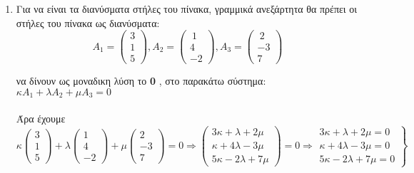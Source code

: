 \documentclass[12pt,a4paper]{article}
\begin{document}
\begin{enumerate}
\item Για να είναι τα διανύσματα στήλες του πίνακα, γραμμικά ανεξάρτητα θα πρέπει οι στήλες του πίνακα ως διανύσματα: \\

\[{A_1} = \left( {\begin{array}{*{20}{c}}
3\\
1\\
5
\end{array}} \right),{A_2} = \left( {\begin{array}{*{20}{c}} \ 
1\\
4\\
{ - 2}
\end{array}} \right),{A_3} = \left( {\begin{array}{*{20}{c}} \ 
2\\
{ - 3}\\
7
\end{array}} \right)\]

να δίνουν ως μοναδικη λύση το \textbf{ 0} , στο παρακάτω σύστημα:
$\kappa {A_1} + \lambda {A_2} + \mu {A_3} = 0$\\\\

Άρα έχουμε 
\[\kappa \left( {\begin{array}{*{20}{c}}
3\\
1\\
5
\end{array}} \right) + \lambda \left( {\begin{array}{*{20}{c}}
1\\
4\\
{ - 2}
\end{array}} \right) + \mu \left( {\begin{array}{*{20}{c}}
2\\
{ - 3}\\
7
\end{array}} \right) = 0 \Rightarrow \left( {\begin{array}{*{20}{c}}
{3\kappa  + \lambda  + 2\mu }\\
{\kappa  + 4\lambda  - 3\mu }\\
{5\kappa  - 2\lambda  + 7\mu }
\end{array}} \right) = 0 \Rightarrow \left. {\begin{array}{*{20}{c}}
{3\kappa  + \lambda  + 2\mu  = 0}\\
{\kappa  + 4\lambda  - 3\mu  = 0}\\
{5\kappa  - 2\lambda  + 7\mu  = 0}
\end{array}} \right\}\]


\end{enumerate}
\end{document}
